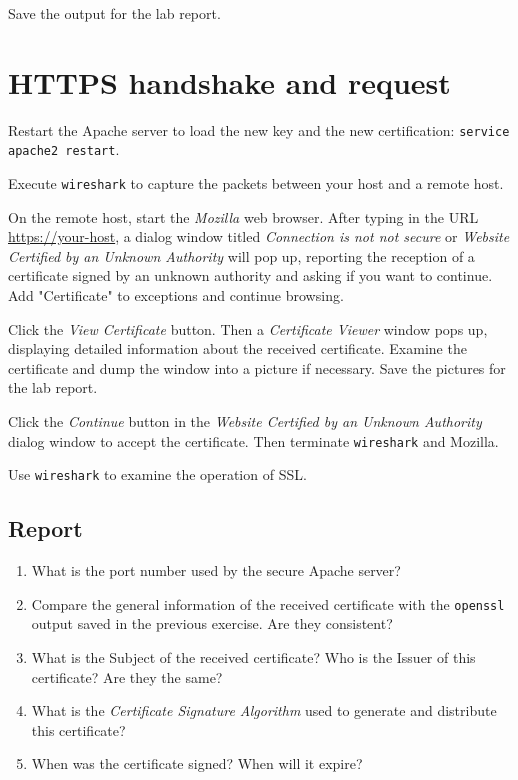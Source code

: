 \documentclass{../UTNetLab}
\begin{document}
    Save the output for the lab report.

\section{HTTPS handshake and request}
    Restart the Apache server to load the new key and the new certification: \lstinline{service apache2 restart}.

    Execute \lstinline{wireshark} to capture the packets between your host and a remote host.

    On the remote host, start the \textit{Mozilla} web browser. After typing in the URL \url{https://your-host}, a dialog window titled \textit{Connection is not not secure} or \textit{Website Certified by an Unknown Authority} will pop up, reporting the reception of a certificate signed by an unknown authority and asking if you want to continue. Add "Certificate" to exceptions and continue browsing.

    Click the \textit{View Certificate} button. Then a \textit{Certificate Viewer} window pops up, displaying detailed information about the received certificate. Examine the certificate and dump the window into a picture if necessary. Save the pictures for the lab report.

    Click the \textit{Continue} button in the \textit{Website Certified by an Unknown Authority} dialog window to accept the certificate. Then terminate \lstinline{wireshark} and Mozilla.

    Use \lstinline{wireshark} to examine the operation of SSL.
    
    
    \subsection*{Report}
    \begin{enumerate}
        \item What is the port number used by the secure Apache server?
        \item Compare the general information of the received certificate with the \lstinline{openssl} output saved in the previous exercise. Are they consistent?
        \item What is the Subject of the received certificate? Who is the Issuer of this certificate? Are they the same?
        \item What is the \textit{Certificate Signature Algorithm} used to generate and distribute this certificate?
        \item When was the certificate signed? When will it expire?
    \end{enumerate}
\end{document}
